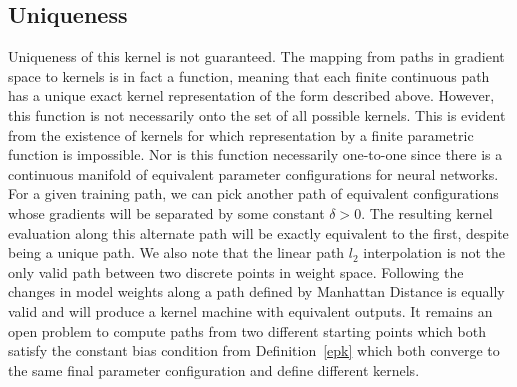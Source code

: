 \subsection{Uniqueness}
Uniqueness of this kernel is not guaranteed. 
The mapping from paths in gradient space to kernels is in fact a function, meaning that each finite continuous path has a unique exact kernel representation of the form described above. 
However, this function is not necessarily onto the set of all possible kernels. 
This is evident from the existence of kernels for which representation by a finite parametric function is impossible.
Nor is this function necessarily one-to-one since there is a continuous manifold of equivalent parameter configurations for neural networks.
For a given training path, we can pick another path of equivalent configurations whose gradients will be separated by some constant $\delta > 0$.
The resulting kernel evaluation along this alternate path will be exactly equivalent to the first, despite being a unique path. 
We also note that the linear path $l_2$ interpolation is not the only valid path between two discrete points in weight space.
Following the changes in model weights along a path defined by Manhattan Distance is equally valid and will produce a kernel machine with equivalent outputs.
It remains an open problem to compute paths from two different starting points which both satisfy the constant bias condition from Definition~\eqref{epk} which both converge to the same final parameter configuration and define different kernels.

